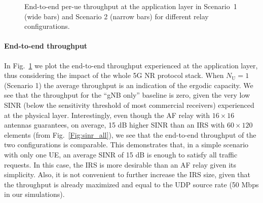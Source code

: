 

\begin{figure}
	\centering
	\setlength{}
	\setlength{}
	
	\caption{End-to-end per-\gls{ue} throughput at the application layer in Scenario~1 (wide bars) and Scenario 2 (narrow bars) for different relay configurations.}
	\label{fig:throughput}
\end{figure}


\paragraph{End-to-end throughput}
In Fig.~\ref{fig:throughput} we plot the end-to-end throughput experienced at the application layer, thus considering the impact of the whole 5G NR protocol stack.
When $N_{\mathrm U}=1$ (Scenario 1) the average throughput is an indication of the ergodic capacity.
We see that the throughput for the ``gNB only'' baseline is zero, given the very low SINR (below the sensitivity threshold of most commercial receivers) experienced at the physical layer. 
Interestingly, even though the AF relay with $16\times 16$ antennas guarantees, on average, 15 dB higher SINR than an IRS with $60\times120$ elements (from Fig.~\ref{Fig:sinr_all}), we see that the end-to-end throughput of the two configurations is comparable. 
This demonstrates that, in a simple scenario with only one UE, an average SINR of 15 dB is enough to satisfy all traffic requests. 
In this case, the IRS is more desirable than an AF relay given its simplicity. Also, it is not convenient to further increase the IRS size, given that the throughput is already maximized and equal to the UDP source rate (50 Mbps in our simulations).

